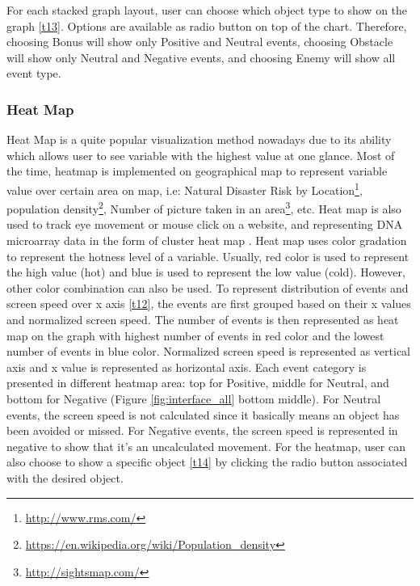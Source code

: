 \documentclass{vgtc}                          %
\begin{document}
For each stacked graph layout, user can choose which object type to show on the graph \ref{t13}. Options are available as radio button on top of the chart. Therefore, choosing Bonus will show only Positive and Neutral events, choosing Obstacle will show only Neutral and Negative events, and choosing Enemy will show all event type.

\subsubsection{Heat Map}

Heat Map is a quite popular visualization method nowadays due to its ability which allows user to see variable with the highest value at one glance. Most of the time, heatmap is implemented on geographical map to represent variable value over certain area on map, i.e: Natural Disaster Risk by Location\footnote{\url{http://www.rms.com/}}, population density\footnote{\url{https://en.wikipedia.org/wiki/Population_density}}, Number of picture taken in an area\footnote{\url{http://sightsmap.com/}}, etc. Heat map is also used to track eye movement or mouse click on a website, and representing DNA microarray data in the form of cluster heat map \cite{friendly}. Heat map uses color gradation to represent the hotness level of a variable. Usually, red color is used to represent the high value (hot) and blue is used to represent the low value (cold). However, other color combination can also be used. To represent distribution of events and screen speed over x axis \ref{t12}, the events are first grouped based on their x values and normalized screen speed. The number of events is then represented as heat map on the graph with highest number of events in red color and the lowest number of events in blue color. Normalized screen speed is represented as vertical axis and x value is represented as horizontal axis. Each event category is presented in different heatmap area: top for Positive, middle for Neutral, and bottom for Negative (Figure \ref{fig:interface_all} bottom middle). For Neutral events, the screen speed is not calculated since it basically means an object has been avoided or missed. For Negative events, the screen speed is represented in negative to show that it's an uncalculated movement. For the heatmap, user can also choose to show a specific object \ref{t14} by clicking the radio button associated with the desired object. 
\end{document}
